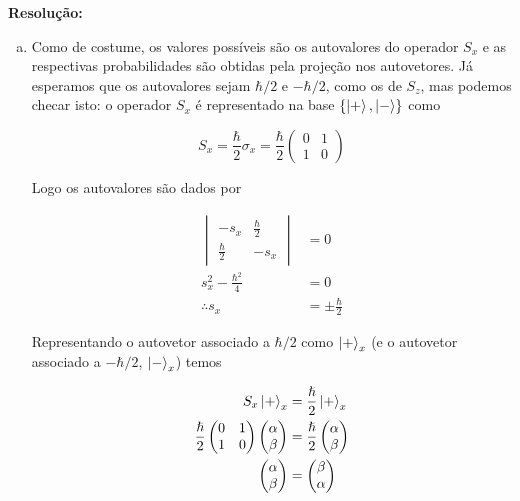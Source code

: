 \documentclass[a4paper, 12pt, notitlepage]{article}
\begin{document}
\begin{enumerate}
\textbf{Resolução:}
\begin{enumerate}[(a)]
  \item Como de costume, os valores possíveis são os autovalores do operador $S_x$ e as respectivas probabilidades são obtidas pela projeção nos autovetores. Já esperamos que os autovalores sejam $\hbar/2$ e $-\hbar/2$, como os de $S_z$, mas podemos checar isto: o operador $S_x$ é representado na base $\{\ket{+}, \ket{-}\}$ como
  
\[
  S_x = \frac{\hbar}{2} \sigma_x = \frac{\hbar}{2}\begin{pmatrix}
  0 & 1 \\
  1 & 0
  \end{pmatrix}
\]

Logo os autovalores são dados por

\begin{align*} 
  \begin{vmatrix}
   -s_x & \frac{\hbar}{2} \\
   \frac{\hbar}{2} & -s_x
   \end{vmatrix} &= 0 \\
   s_x^2 - \frac{\hbar^2}{4} &= 0 \\
   \therefore s_x &= \pm \frac{\hbar}{2}
\end{align*}

Representando o autovetor associado a $\hbar/2$ como $\ket{+}_x$ (e o autovetor associado a $-\hbar/2$, $\ket{-}_x$) temos

\begin{align*}
  S_x \ket{+}_x &= \frac{\hslash}{2} \ket{+}_x \\
  \frac{\hslash}{2}\begin{pmatrix}
  0 & 1 \\
  1 & 0
  \end{pmatrix}\begin{pmatrix}
  \alpha \\
  \beta
  \end{pmatrix} &= 
  \frac{\hslash}{2}\begin{pmatrix}
  \alpha \\
  \beta
  \end{pmatrix} \\
  \begin{pmatrix} \alpha \\ \beta \end{pmatrix} &=
  \begin{pmatrix} \beta \\ \alpha \end{pmatrix}
\end{align*}


\end{enumerate}
\end{enumerate}
\end{document}
